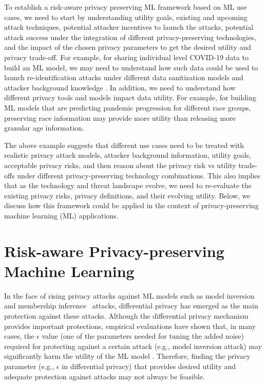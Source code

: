\documentclass{article}
\begin{document}
To establish a risk-aware privacy preserving ML framework based on ML use cases, we need to start by understanding utility goals, existing and upcoming attack techniques, potential attacker incentives to launch the attacks, potential attack success under the integration of different privacy-preserving technologies, and the impact of the chosen privacy parameters to get the desired utility and privacy trade-off. For example, for sharing individual level COVID-19 data to build an ML model, we may need to understand how such data could be used to launch re-identification attacks under different data sanitization models and attacker background knowledge \cite{BrownYXYWGKM22}. In addition, we need to understand how different privacy tools and models impact data utility. For example, for building ML models that are predicting pandemic progression for different race groups, preserving race information may provide more utility than releasing more granular age information.  

The above example suggests that different use cases need to be treated 
with realistic privacy attack models, attacker background information, utility goals, acceptable privacy risks, and then reason about the privacy risk vs utility trade-offs under different privacy-preserving technology combinations. This also implies that as the technology and threat landscape evolve, we need to re-evaluate the existing privacy risks, privacy definitions, and their evolving utility.  Below, we discuss how this framework could be applied in the context of privacy-preserving machine learning (ML) applications.

\section{Risk-aware Privacy-preserving Machine Learning}
In the face of rising privacy attacks against ML models %
such as model inversion and membership inference~\cite{evans-diff} attacks, differential privacy has emerged as the main protection against these attacks. Although the differential privacy mechanism~\cite{diffprivacy} provides important protections, empirical evaluations have shown that, in many cases, the $\epsilon$ value (one of the parameters needed for tuning the added noise) required for protecting against a certain attack (e.g., model inversion attack) %
may significantly %
harm the utility of the ML model \cite{Fredrikson:2015}. Therefore, finding the privacy parameter (e.g., $\epsilon$ in differential privacy) that provides desired utility and adequate protection against attacks may not always be feasible. 
\end{document}
